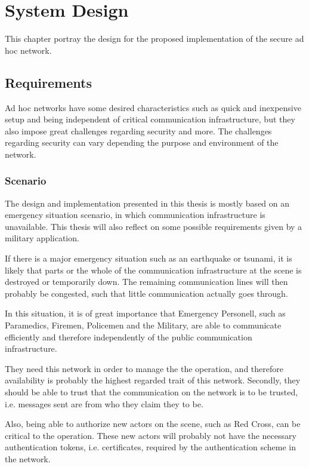 \chapter{System Design}
This chapter portray the design for the proposed implementation of the secure ad
hoc network.

\section{Requirements}
Ad hoc networks have some desired characteristics such as quick and inexpensive
setup and being independent of critical communication infrastructure, but they
also impose great challenges regarding security and more. The challenges
regarding security can vary depending the purpose and environment of the
network.

\subsection{Scenario}
The design and implementation presented in this thesis is mostly based on an
emergency situation scenario, in which communication infrastructure is
unavailable. This thesis will also reflect on some possible requirements given
by a military application.

If there is a major emergency situation such as an earthquake or tsunami, it is
likely that parts or the whole of the communication infrastructure at the scene
is destroyed or temporarily down. The remaining communication lines will then
probably be congested, such that little communication actually goes through.

In this situation, it is of great importance that Emergency Personell, such as
Paramedics, Firemen, Policemen and the Military, are able to communicate
efficiently and therefore independently of the public communication
infrastructure.

They need this network in order to manage the the operation, and therefore
availability is probably the highest regarded trait of this network. Secondly,
they should be able to trust that the communication on the network is to be
trusted, i.e. messages sent are from who they claim they to be.

Also, being able to authorize new actors on the scene, such as Red Cross, can be
critical to the operation. These new actors will probably not have the necessary
authentication tokens, i.e. certificates, required by the authentication scheme
in the network.

